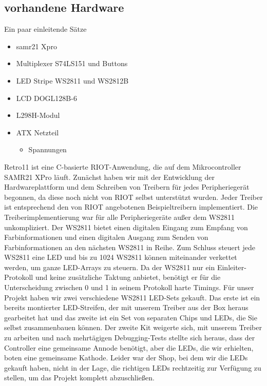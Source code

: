 \documentclass[a4paper]{article}
\begin{document}
  \subsection{vorhandene Hardware}
    \label{sec:hardware_existing}
    Ein paar einleitende Sätze
    \begin{itemize}
      \item samr21 Xpro
      \item Multiplexer S74LS151 und Buttons
      \item LED Stripe WS2811 und WS2812B
      \item LCD DOGL128B-6
      \item L298H-Modul
      \item ATX Netzteil
      \begin{itemize}
        \item Spannungen
      \end{itemize}
    \end{itemize}
    Retro11 ist eine C-basierte RIOT-Anwendung, die auf dem Mikrocontroller SAMR21
    XPro läuft. Zunächst haben wir mit der Entwicklung der Hardwareplattform und
    dem Schreiben von Treibern für jedes Peripheriegerät begonnen, da diese noch
    nicht von RIOT selbst unterstützt wurden. Jeder Treiber ist entsprechend den
    von RIOT angebotenen Beispieltreibern implementiert. Die Treiberimplementierung
    war für alle Peripheriegeräte außer dem WS2811 unkompliziert. Der WS2811 bietet
    einen digitalen Eingang zum Empfang von Farbinformationen und einen digitalen
    Ausgang zum Senden von Farbinformationen an den nächsten WS2811 in Reihe. Zum
    Schluss steuert jede WS2811 eine LED und bis zu 1024 WS2811 können miteinander
    verkettet werden, um ganze LED-Arrays zu steuern. Da der WS2811 nur ein
    Einleiter-Protokoll und keine zusätzliche Taktung anbietet, benötigt er für die
    Unterscheidung zwischen 0 und 1 in seinem Protokoll harte Timings. Für unser
    Projekt haben wir zwei verschiedene WS2811 LED-Sets gekauft. Das erste ist ein
    bereits montierter LED-Streifen, der mit unserem Treiber aus der Box heraus
    gearbeitet hat und das zweite ist ein Set von separaten Chips und LEDs, die Sie
    selbst zusammenbauen können. Der zweite Kit weigerte sich, mit unserem Treiber
    zu arbeiten und nach mehrtägigen Debugging-Tests stellte sich heraus, dass der
    Controller eine gemeinsame Annode benötigt, aber die LEDs, die wir erhielten,
    boten eine gemeinsame Kathode. Leider war der Shop, bei dem wir die LEDs
    gekauft haben, nicht in der Lage, die richtigen LEDs rechtzeitig zur Verfügung
    zu stellen, um das Projekt komplett abzuschließen.
\end{document}
